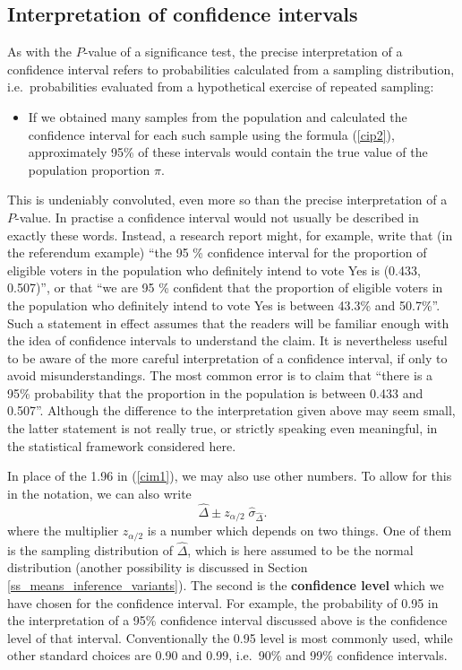 \subsection{Interpretation of confidence intervals}
\label{s_probs_1sampleci_int}

As with the $P$-value of a significance test, the precise
interpretation of a confidence interval refers to probabilities
calculated from a sampling distribution, i.e.\ probabilities evaluated
from a hypothetical exercise of repeated sampling:
\begin{itemize}
\item
If we obtained many samples from the population and calculated the
confidence interval for each such sample using the formula (\ref{cip2}),
approximately 95\% of these intervals would contain the true
value of the population proportion $\pi$.
\end{itemize}
This is undeniably convoluted, even more so than the precise
interpretation of a $P$-value. In practise a confidence
interval would not usually be described in exactly these words. Instead, a
research report might, for example, write that (in the
referendum example)
``the 95 \% confidence interval for the proportion of eligible voters in
the population who definitely intend to vote Yes is (0.433, 0.507)'',
or that ``we are 95 \%
confident that the proportion of eligible voters in the population who
definitely intend to vote Yes is between 43.3\% and 50.7\%''.
Such a statement in effect assumes that the readers will be
familiar enough with the idea of confidence intervals to understand the
claim. It is nevertheless useful to be aware of the more
careful interpretation of a confidence interval, if only to avoid
misunderstandings. The most common error is to claim that
``there is a 95\% probability that the
proportion in the population is between 0.433 and 0.507''.
Although the difference to the interpretation given above
may seem small, the latter statement is not really true, or strictly
speaking even meaningful, in the statistical framework considered here.

In place of the 1.96 in (\ref{cim1}), we may also use other numbers.
To allow for this in the notation, we can also write
\begin{equation}
\hat{\Delta} \pm z_{\alpha/2}\; \hat{\sigma}_{\hat{\Delta}}.
\label{ci_D_gen}
\end{equation}
where the multiplier $z_{\alpha/2}$ is a number which depends
on two things. One of them is the sampling distribution of
$\hat{\Delta}$, which is here assumed to be the normal distribution
(another possibility is discussed in Section
\ref{ss_means_inference_variants}). The second is
the \textbf{confidence level} which we have chosen for the confidence
interval. For example, the probability of 0.95 in the interpretation of
a 95\% confidence interval discussed above is the confidence level of
that interval. Conventionally the 0.95 level is most commonly used,
while other standard choices are 0.90 and 0.99, i.e.\ 90\% and 99\%
confidence intervals.

